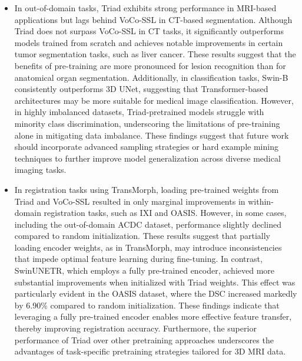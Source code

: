 \begin{itemize}
\item In out-of-domain tasks, Triad exhibits strong performance in MRI-based applications but lags behind VoCo-SSL in CT-based segmentation.
Although Triad does not surpass VoCo-SSL in CT tasks, it significantly outperforms models trained from scratch and achieves notable improvements in certain tumor segmentation tasks, such as liver cancer.
These results suggest that the benefits of pre-training are more pronounced for lesion recognition than for anatomical organ segmentation.
Additionally, in classification tasks, Swin-B consistently outperforms 3D UNet, suggesting that Transformer-based architectures may be more suitable for medical image classification.
However, in highly imbalanced datasets, Triad-pretrained models struggle with minority class discrimination, underscoring the limitations of pre-training alone in mitigating data imbalance.
These findings suggest that future work should incorporate advanced sampling strategies or hard example mining techniques to further improve model generalization across diverse medical imaging tasks.

\item In registration tasks using TransMorph, loading pre-trained weights from Triad and VoCo-SSL resulted in only marginal improvements in within-domain registration tasks, such as IXI and OASIS. However, in some cases, including the out-of-domain ACDC dataset, performance slightly declined compared to random initialization.
These results suggest that partially loading encoder weights, as in TransMorph, may introduce inconsistencies that impede optimal feature learning during fine-tuning.
In contrast, SwinUNETR, which employs a fully pre-trained encoder, achieved more substantial improvements when initialized with Triad weights.
This effect was particularly evident in the OASIS dataset, where the DSC increased markedly by 6.90\% compared to random initialization.
These findings indicate that leveraging a fully pre-trained encoder enables more effective feature transfer, thereby improving registration accuracy.
Furthermore, the superior performance of Triad over other pretraining approaches underscores the advantages of task-specific pretraining strategies tailored for 3D MRI data.

\end{itemize}


